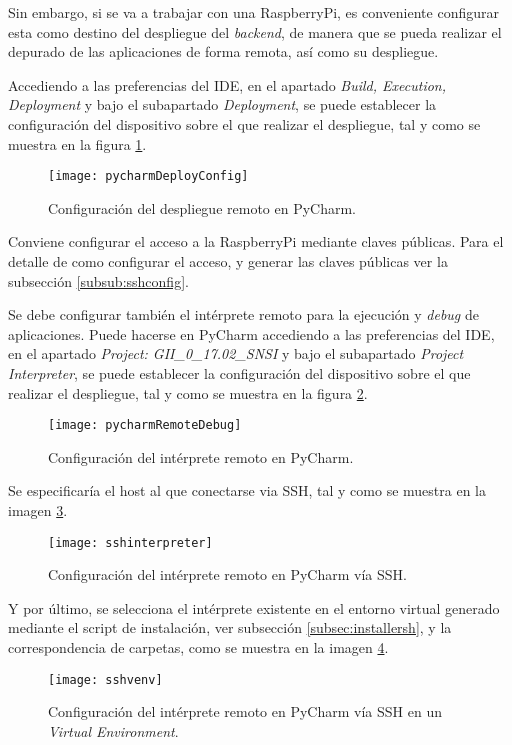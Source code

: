 Sin embargo, si se va a trabajar con una RaspberryPi, es conveniente configurar esta como destino del despliegue del \emph{backend}, de manera que se pueda realizar el depurado de las aplicaciones de forma remota, así como su despliegue. 

Accediendo a las preferencias del IDE, en el apartado \emph{Build, Execution, Deployment} y bajo el subapartado \emph{Deployment}, se puede establecer la configuración del dispositivo sobre el que realizar el despliegue, tal y como se muestra en la figura \ref{fig:pycharmDeployConfig}.


\begin{figure}
	\centering
	\texttt{[image: pycharmDeployConfig]}
	\caption[PyCharm. Configuración de despliegue]{Configuración del despliegue remoto en PyCharm.}\label{fig:pycharmDeployConfig}
\end{figure}

Conviene configurar el acceso a la RaspberryPi mediante claves públicas. Para el detalle de como configurar el acceso, y generar las claves públicas ver la subsección \ref{subsub:sshconfig}.

Se debe configurar también el intérprete remoto para la ejecución y \emph{debug} de aplicaciones. Puede hacerse en PyCharm accediendo a las preferencias del IDE, en el apartado \emph{Project: GII\_0\_17.02\_SNSI} y bajo el subapartado \emph{Project Interpreter}, se puede establecer la configuración del dispositivo sobre el que realizar el despliegue, tal y como se muestra en la figura \ref{fig:pycharmRemoteDebug}.

\begin{figure}
	\centering
	\texttt{[image: pycharmRemoteDebug]}
	\caption[PyCharm. Configuración de intérprete remoto]{Configuración del intérprete remoto en PyCharm.}\label{fig:pycharmRemoteDebug}
\end{figure}

Se especificaría el host al que conectarse via SSH, tal y como se muestra en la imagen \ref{fig:sshinterpreter}.

\begin{figure}
	\centering
	\texttt{[image: sshinterpreter]}
	\caption[PyCharm. Configuración de intérprete remoto. SSH]{Configuración del intérprete remoto en PyCharm vía SSH.}\label{fig:sshinterpreter}
\end{figure}

Y por último, se selecciona el intérprete existente en el entorno virtual generado mediante el script de instalación, ver subsección \ref{subsec:installersh}, y la correspondencia de carpetas, como se muestra en la imagen \ref{fig:sshvenv}.
\begin{figure}
	\centering
	\texttt{[image: sshvenv]}
	\caption[PyCharm. Configuración de intérprete remoto. VirtualEnv]{Configuración del intérprete remoto en PyCharm vía SSH en un \emph{Virtual Environment}.}\label{fig:sshvenv}
\end{figure}



